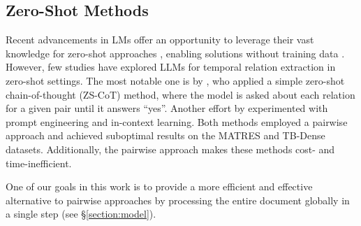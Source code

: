 


\subsection{Zero-Shot Methods}
\label{section:background:models}


Recent advancements in LMs offer an opportunity to leverage their vast knowledge for zero-shot approaches \cite{10.5555/3600270.3601883}, enabling solutions without training data \cite{zhao-etal-2023-pre}. However, few studies have explored LLMs for temporal relation extraction in zero-shot settings. The most notable one is by \citet{yuan-etal-2023-zero}, who applied a simple zero-shot chain-of-thought (ZS-CoT) method, where the model is asked about each relation for a given pair until it answers ``yes''. Another effort by \citet{chan-etal-2024-exploring} experimented with prompt engineering and in-context learning. Both methods employed a pairwise approach and achieved suboptimal results on the MATRES and TB-Dense datasets. Additionally, the pairwise approach makes these methods cost- and time-inefficient. 



One of our goals in this work is to provide a more efficient and effective alternative to pairwise approaches by processing the entire document globally in a single step (see §\ref{section:model}).

